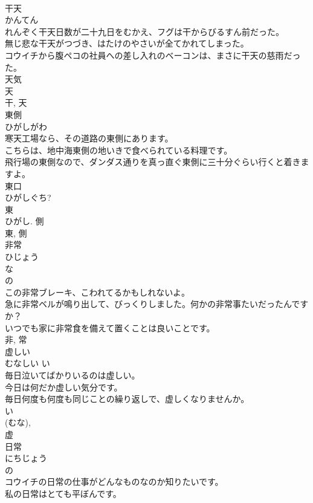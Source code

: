 \documentclass[8pt]{extreport}
\begin{document}
\begin{CJK}{UTF8}{min}
\\	干天	
\\	かんてん	
\\	れんぞく干天日数が二十九日をむかえ、フグは干からびるすん前だった。	
\\	無じ悲な干天がつづき、はたけのやさいが全てかれてしまった。	
\\	コウイチから腹ペコの社員への差し入れのベーコンは、まさに干天の慈雨だった。	
\\	天気 
\\	天 
\\	干, 天	
\\	東側	
\\	ひがしがわ	
\\	寒天工場なら、その道路の東側にあります。	
\\	こちらは、地中海東側の地いきで食べられている料理です。	
\\	飛行場の東側なので、ダンダス通りを真っ直ぐ東側に三十分ぐらい行くと着きますよ。	
\\	東口 
\\	ひがしぐち? 
\\	東 
\\	ひがし. 側 
\\	東, 側	
\\	非常	
\\	ひじょう	
\\	な 
\\	の 
\\	この非常ブレーキ、こわれてるかもしれないよ。	
\\	急に非常ベルが鳴り出して、びっくりしました。何かの非常事たいだったんですか？	
\\	いつでも家に非常食を備えて置くことは良いことです。	
\\	非, 常	
\\	虚しい	
\\	むなしい	い 
\\	毎日泣いてばかりいるのは虚しい。	
\\	今日は何だか虚しい気分です。	
\\	毎日何度も何度も同じことの繰り返しで、虚しくなりませんか。	
\\	い 
\\	(むな), 
\\	虚	
\\	日常	
\\	にちじょう	
\\	の 
\\	コウイチの日常の仕事がどんなものなのか知りたいです。	
\\	私の日常はとても平ぼんです。	

\end{CJK}
\end{document}
